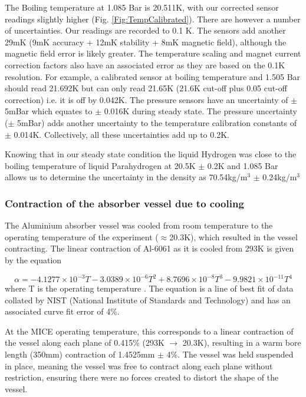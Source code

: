  The Boiling temperature at 1.085 Bar is 20.511K, with our corrected sensor readings slightly higher (Fig. \ref{Fig:TempCalibrated}). There are however a number of uncertainties. Our readings are recorded to 0.1 K. The sensors add another 29mK (9mK accuracy + 12mK stability + 8mK magnetic field), although the magnetic field error is likely greater. The temperature scaling and magnet current correction factors also have an associated error as they are based on the 0.1K resolution. For example, a calibrated sensor at boiling temperature and 1.505 Bar should read 21.692K but can only read 21.65K (21.6K cut-off plus 0.05 cut-off correction) i.e. it is off by 0.042K. The pressure sensors have an uncertainty of $\mathrm{\pm}$ 5mBar which equates to $\mathrm{\pm}$ 0.016K during steady state. The pressure uncertainty ($\mathrm{\pm}$ 5mBar) adds another uncertainty to the temperature calibration constants of $\mathrm{\pm}$ 0.014K. Collectively, all these uncertainties add up to 0.2K.
 
 Knowing that in our steady state condition the liquid Hydrogen was close to the boiling temperature of liquid Parahydrogen  \cite{NOTE524} at 20.5K $\mathrm{\pm}$ 0.2K and 1.085 Bar allows us to determine the uncertainty in the density as 70.54kg/m${}^{3}$ $\mathrm{\pm}$ 0.24kg/m${}^{3}$
 

\subsubsection{Contraction of the absorber vessel due to cooling}
\label{SubSect:Absorber_Contraction}

The Aluminium absorber vessel was cooled from room temperature to the operating temperature of the
experiment ($\mathrm{\approx}$20.3K), which resulted in the vessel contracting. The linear contraction of
Al-6061 as it is cooled from 293K is given by the equation

\begin{equation}
  \alpha =-4.1277\times {10}^{-3}T-3.0389\times {10}^{-6}T^2+8.7696\times {10}^{-8}T^3-9.9821\times {10}^{-11}T^4
\end{equation}
where T is the operating temperature \cite{Hardin}. The equation is a line of best fit of data collated by NIST
(National Institute of Standards and Technology) and has an associated curve fit error of 4\%.

At the MICE operating temperature, this corresponds to a linear contraction of the vessel along each plane of 0.415\%
(293K $\mathrm{\to}$ 20.3K), resulting in a warm bore length (350mm) contraction of 1.4525mm
$\mathrm{\pm}$ 4\%. The vessel was held suspended in place, meaning the vessel was free to contract along
each plane without restriction, ensuring there were no forces created to distort the shape of the vessel.


